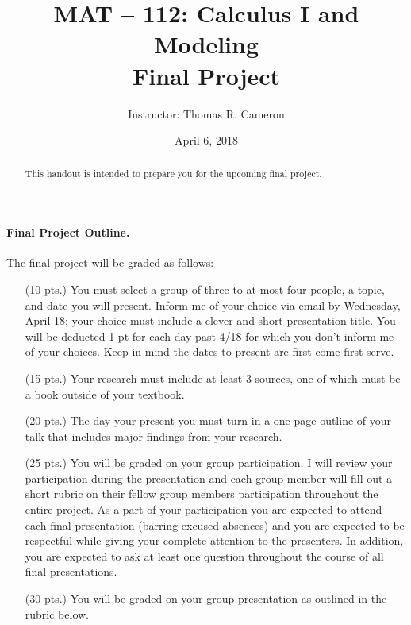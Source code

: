 \documentclass{article}
\title{MAT -- 112: Calculus I and Modeling\\
\large{Final Project}}
\author{Instructor: Thomas R. Cameron}
\date{April 6, 2018}
\begin{document}
\maketitle

\begin{abstract}
 This handout is intended to prepare you for the upcoming final project. 
\end{abstract}

\paragraph*{Final Project Outline.} The final project will be graded as follows:
\begin{itemize}
\item	[(10 pts.)] You must select a group of three to at most four people, a topic, and date you will present. Inform me of your choice via email by Wednesday, April 18; your choice must include a clever and short presentation title. You will be deducted 1 pt for each day past 4/18 for which you don't inform me of your choices. Keep in mind the dates to present are first come first serve.

\item	[(15 pts.)] Your research must include at least 3 sources, one of which must be a book outside of your textbook.
\item [(20 pts.)] The day your present you must turn in a  one page outline of your talk that includes major findings from your research.
\item	[(25 pts.)] You will be graded on your group participation. I will review your participation during the presentation and each group member will fill out a short rubric on their fellow group members participation throughout the entire project. As a part of your participation you are expected to attend each final presentation (barring excused absences) and you are expected to be respectful while giving your complete attention to the presenters. In addition, you are expected to ask at least one question throughout the course of all final presentations.
\item	[(30 pts.)] You will be graded on your group presentation as outlined in the rubric below. 
\end{itemize}
\newpage
\end{document}
